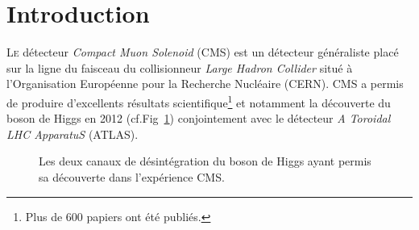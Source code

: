 \chapter*{Introduction}
\renewcommand\chapterillustration{INT/INT}
\ThisULCornerWallPaper{1}{\chapterillustration}

\lettrine[lines=4, slope=-0.5em,nindent=10pt]{L}{e} détecteur \textit{Compact Muon Solenoid} (CMS) est un détecteur généraliste placé sur la ligne du faisceau du collisionneur \textit{Large Hadron Collider} situé à l'Organisation Européenne pour la Recherche Nucléaire (CERN). CMS a permis de produire d'excellents résultats scientifique\footnote{Plus de \num{600} papiers ont été publiés.} et notamment la découverte du boson de Higgs en \num{2012} (cf.Fig~\ref{higgs}) conjointement avec le détecteur \textit{A Toroidal LHC ApparatuS} (ATLAS). 
\vspace*{-0.4cm}
\begin{figure}[ht!]
	\centering
	\hfill
	\caption{Les deux canaux de désintégration du boson de Higgs ayant permis sa découverte dans l'expérience CMS.}
	\label{higgs}
\end{figure}
